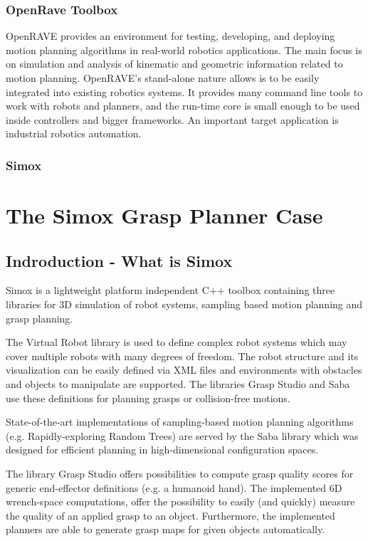\subsubsection{OpenRave Toolbox}
\par
OpenRAVE provides an environment for testing, developing, and deploying motion planning algorithms in real-world robotics applications. The main focus is on simulation and analysis of kinematic and geometric information related to motion planning. OpenRAVE's stand-alone nature allows is to be easily integrated into existing robotics systems. It provides many command line tools to work with robots and planners, and the run-time core is small enough to be used inside controllers and bigger frameworks. An important target application is industrial robotics automation.
\par
\subsubsection{Simox}


\section{The Simox Grasp Planner Case}
\subsection{Indroduction - What is Simox}
Simox is a lightweight platform independent C++ toolbox containing three libraries for 3D simulation of robot systems, sampling based motion planning and grasp planning. \par The Virtual Robot library is used to define complex robot systems which may cover multiple robots with many degrees of freedom. The robot structure and its visualization can be easily defined via XML files and environments with obstacles and objects to manipulate are supported. The libraries Grasp Studio and Saba use these definitions for planning grasps or collision-free motions.\par State-of-the-art implementations of sampling-based motion planning algorithms (e.g. Rapidly-exploring Random Trees) are served by the Saba library which was designed for efficient planning in high-dimensional configuration spaces. \par The library Grasp Studio offers possibilities to compute grasp quality scores for generic end-effector definitions (e.g. a humanoid hand). The implemented 6D wrench-space computations, offer the possibility to easily (and quickly) measure the quality of an applied grasp to an object. Furthermore, the implemented planners are able to generate grasp maps for given objects automatically.
